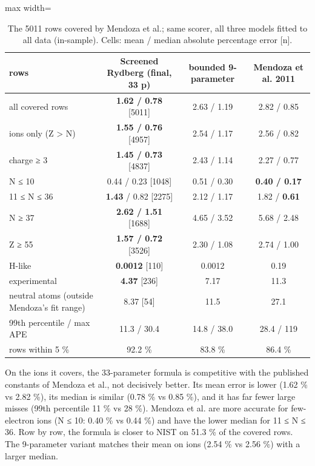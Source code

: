 \documentclass[aps,pra,preprint,notitlepage,superscriptaddress,amsmath,amssymb]{revtex4-2}
\begin{document}
\begin{table}[htbp]
\caption{The 5011 rows covered by Mendoza et al.; same scorer, all three models fitted to all data (in-sample). Cells: mean / median absolute percentage error [n].}
\footnotesize\linespread{1}\selectfont\setlength{\tabcolsep}{5pt}\renewcommand{\arraystretch}{1.1}
\begin{adjustbox}{max width=\linewidth}
\begin{tabular}{lccc}
\hline\hline
rows & Screened Rydberg (final, 33 p) & bounded 9-parameter & Mendoza et al. 2011 \\
\hline
all covered rows & \textbf{1.62 / 0.78} [5011] & 2.63 / 1.19 & 2.82 / 0.85 \\
ions only (Z > N) & \textbf{1.55 / 0.76} [4957] & 2.54 / 1.17 & 2.56 / 0.82 \\
charge ≥ 3 & \textbf{1.45 / 0.73} [4837] & 2.43 / 1.14 & 2.27 / 0.77 \\
N ≤ 10 & 0.44 / 0.23 [1048] & 0.51 / 0.30 & \textbf{0.40 / 0.17} \\
11 ≤ N ≤ 36 & \textbf{1.43} / 0.82 [2275] & 2.12 / 1.17 & 1.82 / \textbf{0.61} \\
N ≥ 37 & \textbf{2.62 / 1.51} [1688] & 4.65 / 3.52 & 5.68 / 2.48 \\
Z ≥ 55 & \textbf{1.57 / 0.72} [3526] & 2.30 / 1.08 & 2.74 / 1.00 \\
H-like & \textbf{0.0012} [110] & 0.0012 & 0.19 \\
experimental & \textbf{4.37} [236] & 7.17 & 11.3 \\
neutral atoms (outside Mendoza's fit range) & 8.37 [54] & 11.5 & 27.1 \\
99th percentile / max APE & 11.3 / 30.4 & 14.8 / 38.0 & 28.4 / 119 \\
rows within 5 \% & 92.2 \% & 83.8 \% & 86.4 \% \\
\hline\hline
\end{tabular}
\end{adjustbox}
\end{table}


On the ions it covers, the 33-parameter formula is competitive with the published constants of Mendoza et al., not decisively better. Its mean error is lower (1.62 \% vs 2.82 \%), its median is similar (0.78 \% vs 0.85 \%), and it has far fewer large misses (99th percentile 11 \% vs 28 \%). Mendoza et al. are more accurate for few-electron ions (N ≤ 10: 0.40 \% vs 0.44 \%) and have the lower median for 11 ≤ N ≤ 36. Row by row, the formula is closer to NIST on 51.3 \% of the covered rows. The 9-parameter variant matches their mean on ions (2.54 \% vs 2.56 \%) with a larger median.
\end{document}
